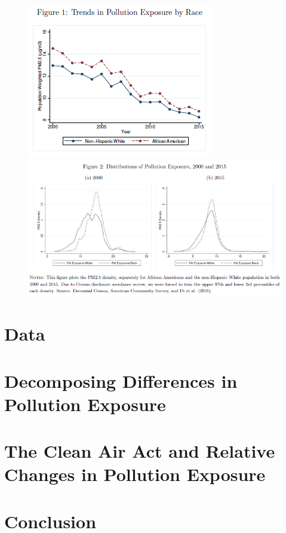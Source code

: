\documentclass[dvipdfmx,12pt]{beamer}
\begin{document}
\begin{frame}{}
  \begin{figure}
    \centering
    \includegraphics[scale = .5]{F1.png}
    \includegraphics[scale = .5]{F2.png}
  \end{figure}
\end{frame}

\section{Data}
\frame{\sectionpage}
\begin{frame}{}

\end{frame}

\section{Decomposing Differences in Pollution Exposure}
\frame{\sectionpage}
\begin{frame}{}
  
\end{frame}

\section{The Clean Air Act and Relative Changes in Pollution Exposure}
\frame{\sectionpage}
\begin{frame}{}
  
\end{frame}

\section{Conclusion}
\frame{\sectionpage}
\begin{frame}{}
  
\end{frame}
\end{document}

